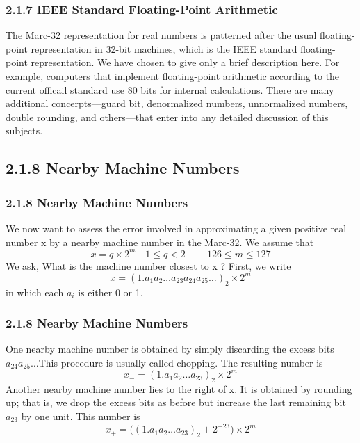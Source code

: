 \documentclass[notheorems,mathserif,table,compress]{beamer}  %
\begin{document}
\begin{frame}
  \frametitle{2.1.7 IEEE Standard Floating-Point Arithmetic}
  The Marc-32 representation for real numbers is patterned after the usual floating-point representation in 32-bit machines, which is the IEEE standard floating-point representation. We have chosen to give only a brief description here. For example, computers that implement floating-point arithmetic according to the current officail standard use 80 bits for internal calculations. There are many additional concerpts---guard bit, denormalized numbers, unnormalized numbers, double rounding, and others---that enter into any detailed discussion of this subjects.
\end{frame}


\subsection{2.1.8 Nearby Machine Numbers}

\begin{frame}
  \frametitle{2.1.8 Nearby Machine Numbers}
  We now want to assess the error involved in approximating a given positive real number x by a nearby machine number in the Marc-32. We assume that 
  \begin{displaymath}
  x=q\times2^m \quad 1\le q < 2 \quad -126 \le m \le 127
  \end{displaymath}
  We ask, What is the machine number closest to x ? First, we write
  \begin{displaymath}
  x=(1.a_1a_2\ldots a_{23}a_{24}a_{25}\ldots)_2\times2^m
  \end{displaymath}
  in which each $a_i$ is either 0 or 1.  
\end{frame}


\begin{frame}
  \frametitle{2.1.8 Nearby Machine Numbers}
  One nearby machine number is obtained by simply discarding the excess bits $a_{24}a_{25}\ldots$This procedure is usually called chopping. The resulting number is
  \begin{displaymath}
  x_-=(1.a_1a_2\ldots a_{23})_2\times2^m
  \end{displaymath}
  Another nearby machine number lies to the right of x. It is obtained by rounding up; that is, we drop the excess bits as before but increase the last remaining bit $a_{23}$ by one unit. This number is 
  \begin{displaymath}
  x_+=\big( (1. a_1 a_2 \ldots a_{23})_2 + 2^{-23} \big) \times 2^m
  \end{displaymath}
\end{frame}
\end{document}
